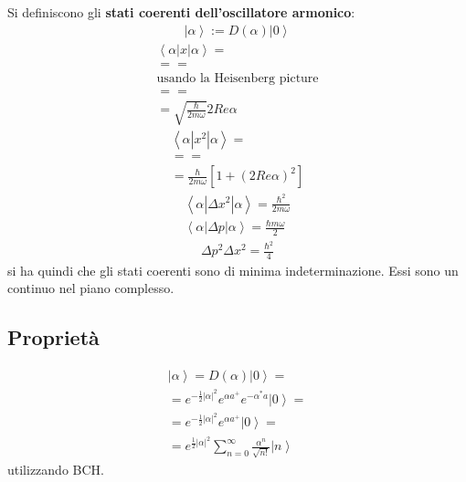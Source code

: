 Si definiscono gli \textbf{stati coerenti dell'oscillatore armonico}:
\begin{equation}\begin{split}
\left |\alpha \right\rangle:=D\left(\alpha\right)\left |0 \right\rangle
\end{split}\end{equation}
\begin{equation}\begin{split}
\left\langle \alpha|x|\alpha \right\rangle=\\
= =\\
\textrm{usando la Heisenberg picture}\\
= =\\
=\sqrt{\frac{\hbar }{2m\omega }}2Re{\alpha}
\end{split}\end{equation}
\begin{equation}\begin{split}
\left\langle \alpha|x^2|\alpha \right\rangle=\\
= =\\
=\frac{\hbar }{2m\omega }\left[1+\left(2Re\alpha\right)^2\right]
\end{split}\end{equation}
\begin{equation}\begin{split}
\left\langle \alpha|\Delta x^2|\alpha \right\rangle=\frac{\hbar ^2}{2m\omega }\\
\left\langle \alpha|\Delta p|\alpha \right\rangle=\frac{\hbar m\omega }{2}
\end{split}\end{equation}
\begin{equation}\begin{split}
\Delta p^2\Delta x^2=\frac{\hbar ^2}{4}
\end{split}\end{equation}
si ha quindi che gli stati coerenti sono di minima indeterminazione. Essi sono un continuo nel piano complesso.

\subsection{Proprietà} %
\begin{equation}\begin{split}
\left |\alpha \right\rangle=D\left(\alpha\right)\left |0 \right\rangle=\\
=e^{-\frac{1}{2}|\alpha|^2}e^{\alpha a^+}e^{-\alpha^*a}\left |0 \right\rangle=\\
=e^{-\frac{1}{2}|\alpha|^2}e^{\alpha a^+}\left |0 \right\rangle=\\
=e^{\frac{1}{2}|\alpha|^2}\sum_{n=0}^{\infty }{\frac{\alpha^n}{\sqrt{n!}}\left |n \right\rangle}
\end{split}\end{equation}
utilizzando BCH.

